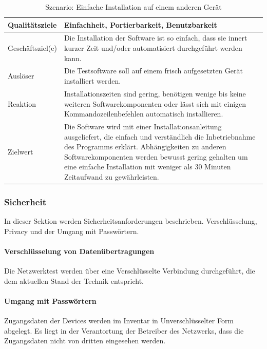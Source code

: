 \documentclass[]{subfiles}
\begin{document}
		\begin{table}[!h]
			\begin{tabularx}{\textwidth}{lX}
				\toprule
				Qualitätsziele & Einfachheit, Portierbarkeit, Benutzbarkeit  \\
				\midrule
				Geschäftsziel(e) & Die Installation der Software ist so einfach, dass sie innert kurzer Zeit und/oder automatisiert durchgeführt werden kann.  \\
				\midrule
				Auslöser & Die Testsoftware soll auf einem frisch aufgesetzten Gerät installiert werden.  \\
				\midrule
				Reaktion & Installationszeiten sind gering, benötigen wenige bis keine weiteren Softwarekomponenten oder lässt sich mit einigen Kommandozeilenbefehlen automatisch installieren.  \\
				\midrule
				Zielwert & Die Software wird mit einer Installationsanleitung ausgeliefert, die einfach und verständlich die Inbetriebnahme des Programms erklärt. Abhängigkeiten zu anderen Softwarekomponenten werden bewusst gering gehalten um eine einfache Installation mit weniger als 30 Minuten Zeitaufwand zu gewährleisten.  \\
				\bottomrule
			\end{tabularx}
			\caption{Szenario: Einfache Installation auf einem anderen Gerät}
		\end{table}
		


	\subsubsection{Sicherheit}
	In dieser Sektion werden Sicherheitsanforderungen beschrieben. 
	Verschlüsselung, Privacy und der Umgang mit Passwörtern.

		\paragraph{Verschlüsselung von Datenübertragungen}
		Die Netzwerktest werden über eine Verschlüsselte Verbindung durchgeführt, die dem aktuellen Stand der Technik entspricht.

		\paragraph{Umgang mit Passwörtern}
		Zugangsdaten der Devices werden im Inventar in Unverschlüsselter Form abgelegt. Es liegt in der Verantortung der Betreiber des Netzwerks, dass die Zugangsdaten nicht von dritten eingesehen werden.
\end{document}
